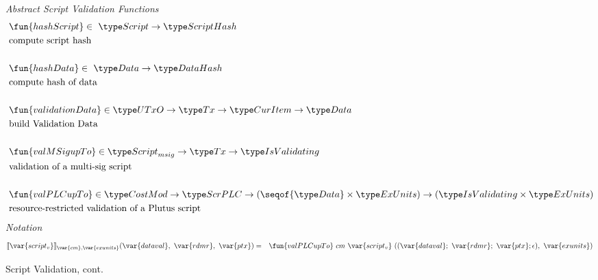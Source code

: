 \begin{figure*}[htb]
  \emph{Abstract Script Validation Functions}
  \begin{align*}
     &\fun{hashScript} \in  ~\Script\to \ScriptHash \\
     &\text{compute script hash} \\~\\
     &\fun{hashData} \in  ~\Data \to \DataHash \\
     &\text{compute hash of data} \\~\\
     &\fun{validationData} \in  \UTxO \to \Tx \to \CurItem \to \Data \\
     &\text{build Validation Data} \\~\\
     &\fun{valMSigupTo} \in\ScriptMSig\to \Tx \to \IsValidating  \\
     &\text{validation of a multi-sig script} \\~\\
     &\fun{valPLCupTo} \in \CostMod \to\ScrPLC \to
    (\seqof{\Data} \times \ExUnits) \to (\IsValidating \times \ExUnits) \\
     &\text{resource-restricted validation of a Plutus script}
  \end{align*}
  \emph{Notation}
  \begin{align*}
    \llbracket \var{script_v} \rrbracket_{\var{cm},\var{exunits}}(\var{dataval},~\var{rdmr},~\var{ptx})
    &=& \fun{valPLCupTo} ~{cm}~\var{script_v}~((\var{dataval};~\var{rdmr};~\var{ptx};\epsilon),~
    \var{exunits})
  \end{align*}
  \caption{Script Validation, cont.}
  \label{fig:defs:functions-valid}
\end{figure*}


\clearpage
